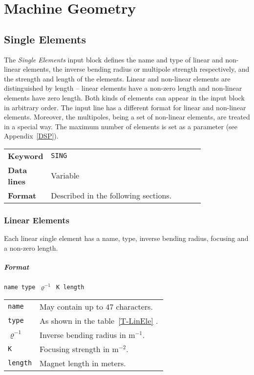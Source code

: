 
\chapter{Machine Geometry} \label{MaGe}

\section{Single Elements} \label{SinEle}

The \textit{Single Elements} input block defines the name and type of linear and non-linear elements, the inverse bending radius or multipole strength respectively, and the strength and length of the elements.
Linear and non-linear elements are distinguished by length -- linear elements have a non-zero length and non-linear elements have zero length.
Both kinds of elements can appear in the input block in arbitrary order.
The input line has a different format for linear and non-linear elements.
Moreover, the multipoles, being a set of non-linear elements, are treated in a special way.
The maximum number of elements is set as a parameter (see Appendix~\ref{DSP}).

\bigskip
\begin{tabular}{@{}lp{0.8\linewidth}}
    \textbf{Keyword}    & \texttt{SING} \\
    \textbf{Data lines} & Variable \\
    \textbf{Format}     & Described in the following sections.
\end{tabular}

\subsection{Linear Elements} \label{LinEle}

Each linear single element has a name, type, inverse bending radius, focusing and a non-zero length.

\paragraph{Format} \texttt{name type $\varrho^{-1}$ K length}

\bigskip
\begin{tabular}{@{}lp{0.8\linewidth}}
    \texttt{name} & May contain up to 47 characters. \\
    \texttt{type} & As shown in the table~\ref{T-LinEle} .\\
    \texttt{$ \varrho^{-1}$} &  Inverse bending radius in $\mathrm{m}^{-1}$. \\
    \texttt{K} & Focusing strength in $\mathrm{m}^{-2}$. \\
    \texttt{length} & Magnet length in meters.
\end{tabular}

